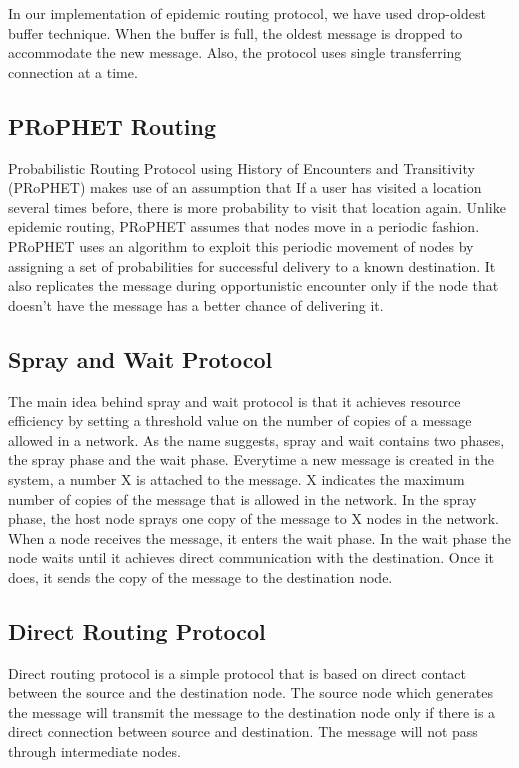 \documentclass[conference]{IEEEtran}
\begin{document}
In our implementation of epidemic routing protocol, we have used drop-oldest buffer technique. When the buffer is full, the oldest message is dropped to accommodate the new message. Also, the protocol uses single transferring connection at a time. 

\subsection{PRoPHET Routing}
Probabilistic Routing Protocol using History of Encounters and Transitivity (PRoPHET) \cite{prob} makes use of an assumption that If a user has visited a location several times before, there is more probability to visit that location again. Unlike epidemic routing, PRoPHET assumes that nodes move in a periodic fashion. PRoPHET uses an algorithm to exploit this periodic movement of nodes by assigning a set of probabilities for successful delivery to a known destination. It also replicates the message during opportunistic encounter only if the node that doesn't have the message has a better chance of delivering it.     

\subsection{Spray and Wait Protocol}
The main idea behind spray and wait protocol \cite{spray} is that it achieves resource efficiency by setting a threshold value on the number of copies of a message allowed in a network.
As the name suggests, spray and wait contains two phases, the spray phase and the wait phase. Everytime a new message is created in the system, a number X is attached to the message. X indicates the maximum number of copies of the message that is allowed in the network. In the spray phase, the host node sprays one copy of the message to X nodes in the network. When a node receives the message, it enters the wait phase. In the wait phase the node waits until it achieves direct communication with the destination. Once it does, it sends the copy of the message to the destination node.   

\subsection{Direct Routing Protocol}
Direct routing protocol is a simple protocol that is based on direct contact between the source and the destination node. The source node which generates the message will transmit the message to the destination node only if there is a direct connection between source and destination. The message will not pass through intermediate nodes. 
\end{document}
